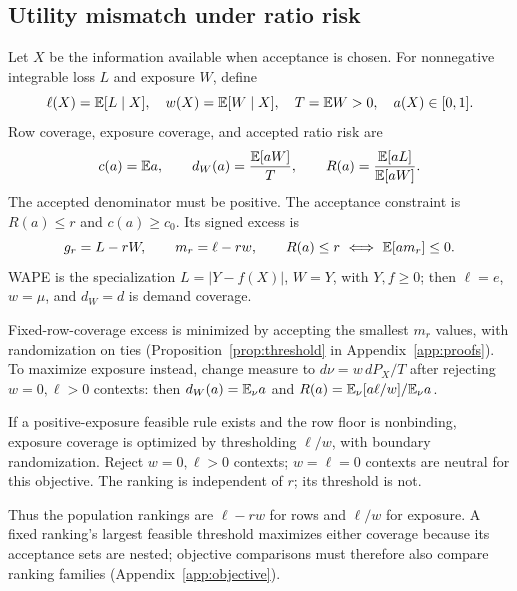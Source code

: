\subsection{Utility mismatch under ratio risk}
Let $X$ be the information available when acceptance is chosen. For
nonnegative integrable loss $L$ and exposure $W$, define
\[
 \ell(X)=\mathbb{E}[L\mid X],\quad w(X)=\mathbb{E}[W\mid X],\quad T=\mathbb{E} W>0,
 \quad a(X)\in[0,1].
\]
Row coverage, exposure coverage, and accepted ratio risk are
\begin{equation}
 c(a)=\mathbb{E} a,\qquad d_W(a)=\frac{\mathbb{E}[aW]}{T},\qquad
 R(a)=\frac{\mathbb{E}[aL]}{\mathbb{E}[aW]}.
 \label{eq:ratio}
\end{equation}
The accepted denominator must be positive. The acceptance constraint is $R(a)\leq r$
and $c(a)\geq c_0$. Its signed excess is
\begin{equation}
 g_r=L-rW,\qquad m_r=\ell-rw,\qquad
 R(a)\leq r\ \Longleftrightarrow\ \mathbb{E}[a m_r]\leq0.
 \label{eq:excess}
\end{equation}
WAPE is the specialization $L=|Y-f(X)|$, $W=Y$, with $Y,f\geq0$;
then $\ell=e$, $w=\mu$, and $d_W=d$ is demand coverage.

Fixed-row-coverage excess is minimized by accepting the smallest
$m_r$ values, with randomization on ties (Proposition~\ref{prop:threshold}
in Appendix~\ref{app:proofs}). To maximize exposure instead, change measure
to $d\nu=w\,dP_X/T$ after rejecting $w=0,\ell>0$ contexts: then $d_W(a)=\mathbb{E}_\nu a$ and
$R(a)=\mathbb{E}_\nu[a\ell/w]/\mathbb{E}_\nu a$.
\setcounter{proposition}{1}
\begin{proposition}
\label{prop:weighted}
If a positive-exposure feasible rule exists and the row floor is
nonbinding, exposure coverage is optimized by thresholding $\ell/w$,
with boundary randomization. Reject $w=0,\ell>0$ contexts; $w=\ell=0$
contexts are neutral for this objective. The ranking is independent of
$r$; its threshold is not.
\end{proposition}
Thus the population rankings are $\ell-rw$ for rows and $\ell/w$ for
exposure. A fixed ranking's largest feasible threshold maximizes either
coverage because its acceptance sets are nested; objective comparisons
must therefore also compare ranking families (Appendix~\ref{app:objective}).

